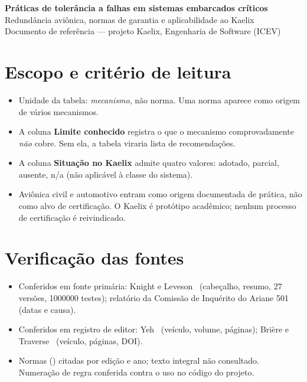 \documentclass[10pt,a4paper,landscape]{article}
\begin{document}
\begin{center}
{\Large\bfseries Práticas de tolerância a falhas em sistemas embarcados críticos}\\[2pt]
{\large Redundância aviônica, normas de garantia e aplicabilidade ao Kaelix}\\[4pt]
{\footnotesize Documento de referência --- projeto Kaelix, Engenharia de Software (ICEV)}
\end{center}

\vspace{2pt}

\section{Escopo e critério de leitura}

\begin{itemize}
\item Unidade da tabela: \emph{mecanismo}, não norma. Uma norma aparece como origem de vários mecanismos.
\item A coluna \textbf{Limite conhecido} registra o que o mecanismo comprovadamente \emph{não} cobre. Sem ela, a tabela viraria lista de recomendações.
\item A coluna \textbf{Situação no Kaelix} admite quatro valores: \textsf{adotado}, \textsf{parcial}, \textsf{ausente}, \textsf{n/a} (não aplicável à classe do sistema).
\item Aviônica civil e automotivo entram como origem documentada de prática, não como alvo de certificação. O Kaelix é protótipo acadêmico; nenhum processo de certificação é reivindicado.
\end{itemize}

\section{Verificação das fontes}

\begin{itemize}
\item Conferidos em fonte primária: Knight e Leveson~\cite{knight1986} (cabeçalho, resumo, 27 versões, \num{1000000} testes); relatório da Comissão de Inquérito do Ariane 501~\cite{esa1996} (datas e causa).
\item Conferidos em registro de editor: Yeh~\cite{yeh1996} (veículo, volume, páginas); Brière e Traverse~\cite{briere1993} (veículo, páginas, DOI).
\item Normas (\cite{do178c,iec61508,iso26262,arinc653,misra2008,jsf2005}) citadas por edição e ano; texto integral não consultado. Numeração de regra conferida contra o uso no código do projeto.
\end{itemize}
\end{document}
